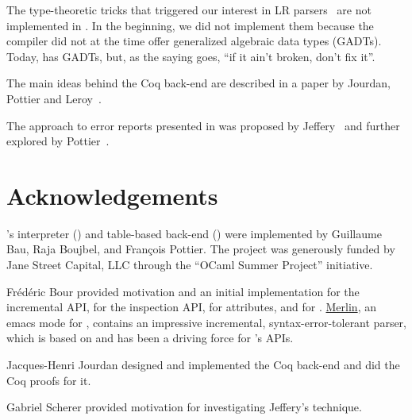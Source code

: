 \documentclass[onecolumn,11pt,nocopyrightspace,preprint]{sigplanconf}
\begin{document}
The type-theoretic tricks that triggered our interest in LR
parsers~\cite{pottier-regis-gianas-typed-lr} are not implemented in \menhir.
In the beginning, we did not implement them because the \ocaml compiler did
not at the time offer generalized algebraic data types (GADTs). Today, \ocaml
has GADTs, but, as the saying goes, ``if it ain't broken, don't fix it''.

The main ideas behind the Coq back-end are described in a paper by Jourdan,
Pottier and Leroy~\cite{jourdan-leroy-pottier-12}.

The approach to error reports presented in  was
proposed by Jeffery~\citeyear{jeffery-03} and further explored by
Pottier~\citeyear{pottier-reachability-cc-2016}.


\section{Acknowledgements}

\menhir's interpreter (\ointerpret) and table-based back-end (\otable) were
implemented by Guillaume Bau, Raja Boujbel, and François Pottier. The project
was generously funded by Jane Street Capital, LLC through the ``OCaml Summer
Project'' initiative.

Frédéric Bour provided motivation and an initial implementation for the
incremental API, for the inspection API, for attributes, and for \menhirsdk.
\href{https://github.com/ocaml/merlin}{Merlin}, an emacs mode for \ocaml,
contains an impressive incremental, syntax-error-tolerant \ocaml parser,
which is based on \menhir and has been a driving force for \menhir's APIs.

Jacques-Henri Jourdan designed and implemented the Coq back-end and did the
Coq proofs for it.

Gabriel Scherer provided motivation for investigating Jeffery's technique.





\end{document}
